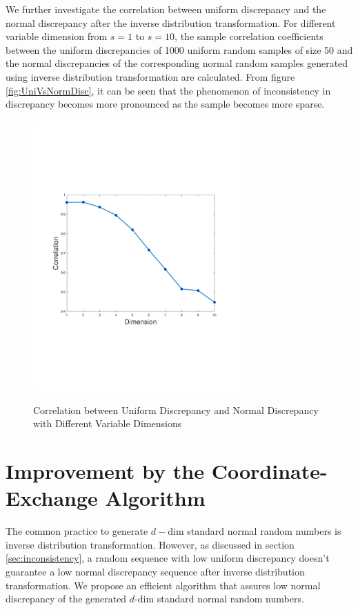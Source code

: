 \documentclass[graybox]{svmult}
\begin{document}
We further investigate the correlation between uniform discrepancy and the normal discrepancy after the inverse distribution transformation. For different variable dimension from $s=1$ to $s=10$, the sample correlation coefficients between the uniform discrepancies of 1000 uniform random samples of size 50 and the normal discrepancies of the corresponding normal random samples generated using inverse distribution transformation are calculated. From figure \ref{fig:UniVsNormDisc}, it can be seen that the phenomenon of inconsistency in discrepancy becomes more pronounced as the sample becomes more sparse.

\begin{figure}[htbp]
\label{fig:DimVsDisc}
\centering
{\includegraphics[width=8cm]{dimVsdisc.pdf}}
\caption{Correlation between Uniform Discrepancy and Normal Discrepancy with Different Variable Dimensions}
\end{figure}

\section{Improvement by the Coordinate-Exchange Algorithm}
The common practice to generate $d-$dim standard normal random numbers is inverse distribution transformation. However, as discussed in section \ref{sec:inconsistency}, a random sequence with low uniform discrepancy doesn't guarantee a low normal discrepancy sequence after inverse distribution transformation. We propose an efficient algorithm that assures low normal discrepancy of the generated $d$-dim standard normal random numbers.
\end{document}
